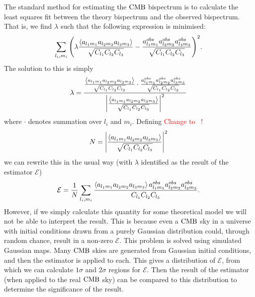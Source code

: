     The standard method for estimating the $\text{CMB}$ bispectrum is to calculate the least squares
    fit between the theory bispectrum and the observed bispectrum. That is, we find $\lambda$
    such that the following expression is minimised:
    \begin{align}
        \sum_{l_i,m_i}{\left(\lambda\frac{\left<a_{l_1m_1}a_{l_2m_2}a_{l_3m_3}\right>}{\sqrt{C_{l_1}C_{l_2}C_{l_3}}}
                - \frac{a^{obs}_{l_1m_1}a^{obs}_{l_2m_2}a^{obs}_{l_3m_3}}{\sqrt{C_{l_1}C_{l_2}C_{l_3}}}\right)}^2.
    \end{align}
    The solution to this is simply
    \begin{align}
        \lambda = \frac{\frac{\left<a_{l_1m_1}a_{l_2m_2}a_{l_3m_3}\right>}{\sqrt{C_{l_1}C_{l_2}C_{l_3}}}\cdot\frac{a^{obs}_{l_1m_1}a^{obs}_{l_2m_2}a^{obs}_{l_3m_3}}{\sqrt{C_{l_1}C_{l_2}C_{l_3}}}}{\left|\frac{\left<a_{l_1m_1}a_{l_2m_2}a_{l_3m_3}\right>}{\sqrt{C_{l_1}C_{l_2}C_{l_3}}}\right|^2}
    \end{align}
    where $\cdot$ denotes summation over $l_i$ and $m_i$.
    Defining
    \textcolor{red}{Change to~\cite{Fergusson_polyspectra, Fergusson_efficient} !}
    \begin{align}
        N = \left|\frac{\left<a_{l_1m_1}a_{l_2m_2}a_{l_3m_3}\right>}{\sqrt{C_{l_1}C_{l_2}C_{l_3}}}\right|^2
    \end{align}
    we can rewrite this in the usual way (with $\lambda$ identified as the result of the estimator $\mathcal{E}$)
    \begin{align}
        \mathcal{E} = \frac{1}{N}\sum_{l_i,m_i}\frac{\left<a_{l_1m_1}a_{l_2m_2}a_{l_3m_3}\right>a^{obs}_{l_1m_1}a^{obs}_{l_2m_2}a^{obs}_{l_3m_3}}{C_{l_1}C_{l_2}C_{l_3}}.
    \end{align}
    However, if we simply calculate this quantity for some theoretical model we will not be able to
    interpret the result. This is because even a $\text{CMB}$ sky in a universe with initial conditions
    drawn from a purely Gaussian distribution could, through random chance,
    result in a non-zero $\mathcal{E}$. This problem is solved using simulated Gaussian maps.
    Many $\text{CMB}$ skies are generated from Gaussian initial conditions, and then the estimator
    is applied to each. This gives a distribution of $\mathcal{E}$, from which we can
    calculate $1\sigma$ and $2\sigma$ regions for $\mathcal{E}$. Then the result of the
    estimator (when applied to the real $\text{CMB}$ sky) can be compared to this distribution
    to determine the significance of the result.


